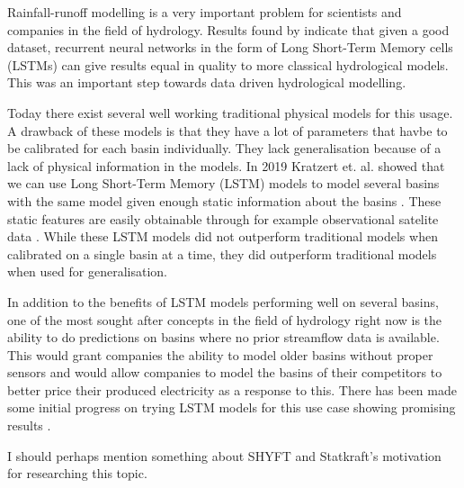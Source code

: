 Rainfall-runoff modelling is a very important problem for scientists and 
companies in the field of hydrology.
Results found by \cite{lstm_first_paper} indicate that given a good dataset,
recurrent neural networks in the form of Long Short-Term Memory cells (LSTMs)
can give results equal in quality to more classical hydrological models.
This was an important step towards data driven hydrological modelling. 

Today there exist several well working traditional physical models for this usage. \citationneeded
A drawback of these models is that they have a lot of parameters that havbe to be 
calibrated for each basin individually. They lack generalisation because of a lack of 
physical information in the models. \citationneeded In 2019 Kratzert et. al. showed
that we can use Long Short-Term Memory (LSTM) models to model several basins with the same model
given enough static information about the basins \cite{lstm_second_paper}. These 
static features are easily obtainable through for example observational satelite 
data \cite{CAMELS_US}. While these LSTM models did not outperform traditional models when calibrated on a single basin at 
a time, they did outperform traditional models when used for generalisation.

In addition to the benefits of LSTM models performing well on several basins, 
one of the most sought after concepts in the field of hydrology right now is the 
ability to do predictions on basins where no prior streamflow data is available. \citationneeded
This would grant companies the ability to model older basins without proper sensors
and would allow companies to model the basins of their competitors to better price 
their produced electricity as a response to this. There has been made some initial 
progress on trying LSTM models for this use case showing promising results \cite{lstm_third_paper}. 

I should perhaps mention something about SHYFT \cite{Shyft} and Statkraft's motivation for 
researching this topic.

